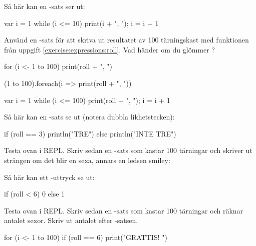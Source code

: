 \Subtask Så här kan en -sats ser ut:
\begin{Code}
var i = 1
while (i <= 10) { print(i + ", "); i = i + 1 }
\end{Code}
Använd en -sats för att skriva ut resultatet av 100 tärningskast med funktionen  från uppgift \ref{exercise:expressions:roll}. Vad händer om du glömmer  ?


\SOLUTION

\TaskSolved \what

\SubtaskSolved
\begin{Code}
for (i <- 1 to 100) print(roll + ", ")
\end{Code}

\SubtaskSolved
\begin{Code}
(1 to 100).foreach(i => print(roll + ", "))
\end{Code}


\SubtaskSolved
\begin{Code}
var i = 1
while (i <= 100) { print(roll + ", "); i = i + 1 }
\end{Code}




\QUESTEND







\QUESTBEGIN

\Task \what

\Subtask Så här kan en -sats se ut (notera dubbla likhetstecken):
\begin{Code}
if (roll == 3) println("TRE") else println("INTE TRE")
\end{Code}
Testa ovan i REPL. Skriv sedan en -sats som kastar 100 tärningar och skriver ut strängen  om det blir en sexa, annars en ledsen smiley: 

\Subtask Så här kan ett -uttryck se ut:
\begin{Code}
if (roll < 6) 0 else 1
\end{Code}
Testa ovan i REPL. Skriv sedan en -sats som kastar 100 tärningar och räknar antalet sexor. Skriv ut antalet efter -satsen.

\SOLUTION

\TaskSolved \what

\SubtaskSolved
\begin{Code}
for (i <- 1 to 100) if (roll == 6) print("GRATTIS! ")
\end{Code}

